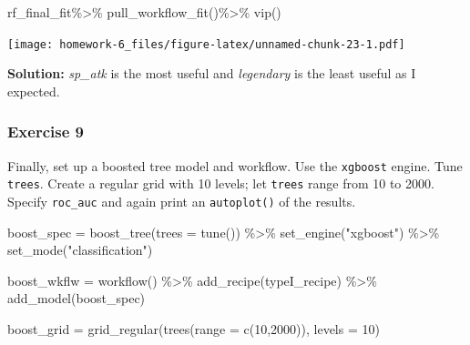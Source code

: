 \documentclass[
]{article}
\newenvironment{Shaded}{\begin{snugshade}}{\end{snugshade}}
\newcommand{\AttributeTok}[1]{\textcolor[rgb]{0.77,0.63,0.00}{#1}}
\newcommand{\DecValTok}[1]{\textcolor[rgb]{0.00,0.00,0.81}{#1}}
\newcommand{\FunctionTok}[1]{\textcolor[rgb]{0.00,0.00,0.00}{#1}}
\newcommand{\NormalTok}[1]{#1}
\newcommand{\OtherTok}[1]{\textcolor[rgb]{0.56,0.35,0.01}{#1}}
\newcommand{\SpecialCharTok}[1]{\textcolor[rgb]{0.00,0.00,0.00}{#1}}
\newcommand{\StringTok}[1]{\textcolor[rgb]{0.31,0.60,0.02}{#1}}
\begin{document}
\begin{Shaded}
\begin{Highlighting}[]
\NormalTok{rf\_final\_fit}\SpecialCharTok{\%\textgreater{}\%}
  \FunctionTok{pull\_workflow\_fit}\NormalTok{()}\SpecialCharTok{\%\textgreater{}\%}
  \FunctionTok{vip}\NormalTok{()}
\end{Highlighting}
\end{Shaded}

\texttt{[image: homework-6\_files/figure-latex/unnamed-chunk-23-1.pdf]}

\textbf{Solution: } \emph{sp\_atk} is the most useful and
\emph{legendary} is the least useful as I expected.

\hypertarget{exercise-9}{%
\subsubsection{Exercise 9}\label{exercise-9}}

Finally, set up a boosted tree model and workflow. Use the
\texttt{xgboost} engine. Tune \texttt{trees}. Create a regular grid with
10 levels; let \texttt{trees} range from 10 to 2000. Specify
\texttt{roc\_auc} and again print an \texttt{autoplot()} of the results.

\begin{Shaded}
\begin{Highlighting}[]
\NormalTok{boost\_spec }\OtherTok{=} \FunctionTok{boost\_tree}\NormalTok{(}\AttributeTok{trees =} \FunctionTok{tune}\NormalTok{()) }\SpecialCharTok{\%\textgreater{}\%}
  \FunctionTok{set\_engine}\NormalTok{(}\StringTok{"xgboost"}\NormalTok{) }\SpecialCharTok{\%\textgreater{}\%}
  \FunctionTok{set\_mode}\NormalTok{(}\StringTok{"classification"}\NormalTok{)}

\NormalTok{boost\_wkflw }\OtherTok{=} \FunctionTok{workflow}\NormalTok{() }\SpecialCharTok{\%\textgreater{}\%} 
  \FunctionTok{add\_recipe}\NormalTok{(typeI\_recipe) }\SpecialCharTok{\%\textgreater{}\%}
  \FunctionTok{add\_model}\NormalTok{(boost\_spec)}
\end{Highlighting}
\end{Shaded}

\begin{Shaded}
\begin{Highlighting}[]
\NormalTok{boost\_grid }\OtherTok{=} \FunctionTok{grid\_regular}\NormalTok{(}\FunctionTok{trees}\NormalTok{(}\AttributeTok{range =} \FunctionTok{c}\NormalTok{(}\DecValTok{10}\NormalTok{,}\DecValTok{2000}\NormalTok{)),}
                          \AttributeTok{levels =} \DecValTok{10}\NormalTok{)}
\end{Highlighting}
\end{Shaded}
\end{document}

